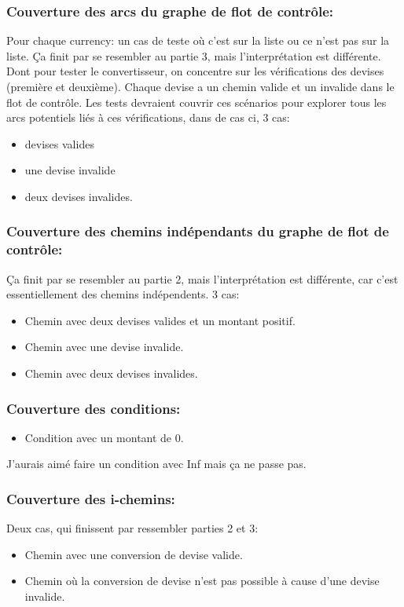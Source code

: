 \documentclass{article}
\begin{document}
\subsubsection{Couverture des arcs du graphe de flot de contrôle:}
Pour chaque currency: un cas de teste où c'est sur la liste ou ce n'est pas sur la liste. Ça finit par se resembler au partie 3, mais l'interprétation est différente. Dont pour tester le convertisseur, on concentre sur les vérifications des devises (première et deuxième). Chaque devise a un chemin valide et un invalide dans le flot de contrôle. Les tests devraient couvrir ces scénarios pour explorer tous les arcs potentiels liés à ces vérifications, dans de cas ci, 3 cas:
\begin{itemize}
    \item devises valides
    \item une devise invalide
    \item deux devises invalides.
\end{itemize}

\subsubsection{Couverture des chemins indépendants du graphe de flot de contrôle:}
Ça finit par se resembler au partie 2, mais l'interprétation est différente, car c'est essentiellement des chemins indépendents. 3 cas:
\begin{itemize}
    \item Chemin avec deux devises valides et un montant positif.
    \item Chemin avec une devise invalide.
    \item Chemin avec deux devises invalides.
\end{itemize}

\subsubsection{Couverture des conditions:}
\begin{itemize}
    \item Condition avec un montant de 0.
\end{itemize}
J'aurais aimé faire un condition avec Inf mais ça ne passe pas.

\subsubsection{Couverture des i-chemins:}
Deux cas, qui finissent par ressembler parties 2 et 3:
\begin{itemize}
    \item Chemin avec une conversion de devise valide.
    \item Chemin où la conversion de devise n'est pas possible à cause d'une devise invalide.
\end{itemize}
\end{document}
